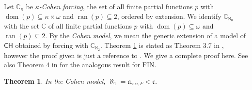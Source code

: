 \documentclass[11pt]{amsart}
\newcommand{\C}{\mathbb{C}}
\renewcommand{\a}{\mathfrak{a}}
\renewcommand{\c}{\mathfrak{c}}
\DeclareMathOperator{\dom}{dom}
\DeclareMathOperator{\ran}{ran}
\newtheorem{thm}{Theorem}[section]
\theoremstyle{definition}
\theoremstyle{remark}
\newcommand{\CH}{\mathsf{CH}}
\renewcommand{\1}{\mathbf{1}}
\newcommand{\FIN}{\mathrm{FIN}}
\begin{document}
Let $\C_\kappa$ be \emph{$\kappa$-Cohen forcing}, the set of all finite partial functions $p$ with $\dom(p)\subseteq\kappa\times\omega$ and $\ran(p)\subseteq 2$, ordered by extension. We identify $\C_{\aleph_0}$ with the set $\C$ of all finite partial functions $p$ with $\dom(p)\subseteq\omega$ and $\ran(p)\subseteq 2$. By the \emph{Cohen model}, we mean the generic extension of a model of $\CH$ obtained by forcing with $\C_{\aleph_2}$. Theorem \ref{thm:cohen} is stated as Theorem 3.7 in \cite{MR1756262}, however the proof given is just a reference to \cite{MR597342}. We give a complete proof here. See also Theorem 4 in \cite{MR3685044} for the analogous result for $\FIN$. %

\begin{thm}\label{thm:cohen}
	In the Cohen model, $\aleph_1=\a_{\mathrm{vec},F}<\c$.
\end{thm}
\end{document}
